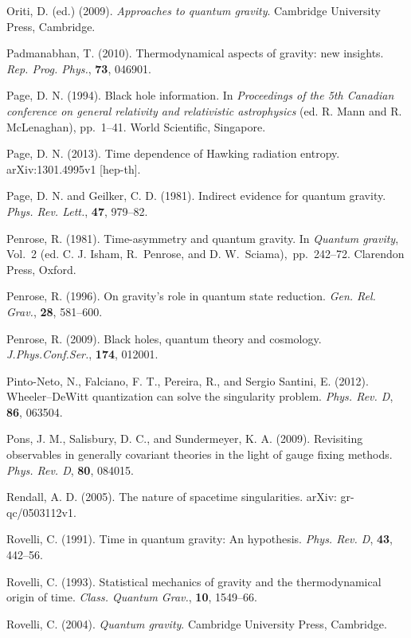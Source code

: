 \documentclass[12pt]{article}
\begin{document}
\bibitem{} Oriti, D. (ed.) (2009). {\em Approaches to quantum
           gravity}. Cambridge University Press, Cambridge. 

\bibitem{} Padmanabhan, T. (2010). Thermodynamical aspects of gravity:
new insights. {\em Rep. Prog. Phys.}, {\bf 73}, 046901.

\bibitem{} Page, D. N. (1994). Black hole information. In {\em
    Proceedings of the 5th Canadian conference on general relativity
    and relativistic astrophysics} (ed. R. Mann and R. McLenaghan),
  pp.~1--41. World Scientific, Singapore. 

\bibitem{} Page, D. N. (2013). Time dependence of Hawking radiation
  entropy. arXiv:1301.4995v1 [hep-th].

\bibitem{} Page, D. N. and Geilker, C. D. (1981). Indirect evidence
           for quantum gravity. {\em Phys. Rev. Lett.}, {\bf 47},
           979--82.

\bibitem{} Penrose, R. (1981). Time-asymmetry and quantum gravity.
           In {\em Quantum gravity}, Vol.~2 (ed. C. J. Isham,
           R.~Penrose, and D. W.~Sciama),~pp.~242--72. Clarendon Press, Oxford.

\bibitem{} Penrose, R. (1996). On gravity's role in quantum state reduction.
           {\em Gen. Rel. Grav.}, {\bf 28}, 581--600.

\bibitem{} Penrose, R. (2009).  	
Black holes, quantum theory and cosmology.
{\em J.Phys.Conf.Ser.}, {\bf 174}, 012001.

\bibitem{} Pinto-Neto, N., Falciano, F. T., Pereira, R., and Sergio
  Santini, E. (2012). Wheeler--DeWitt quantization can solve the
  singularity problem. {\em Phys. Rev. D}, {\bf 86}, 063504.

\bibitem{} Pons, J. M., Salisbury, D. C., and Sundermeyer,
K. A. (2009).
Revisiting observables in generally covariant theories in the light of
gauge fixing methods. {\em Phys. Rev. D}, {\bf 80}, 084015.

\bibitem{} Rendall, A. D. (2005). The nature of spacetime
  singularities. arXiv: gr-qc/0503112v1. 

\bibitem{} Rovelli, C. (1991). Time in quantum gravity: An hypothesis.
 {\em Phys. Rev. D}, {\bf 43}, 442--56.

\bibitem{} Rovelli, C. (1993). Statistical mechanics of gravity and
  the thermodynamical origin of time. {\em Class. Quantum Grav.}, {\bf
    10},  1549--66. 

\bibitem{} Rovelli, C. (2004). {\em Quantum gravity}. Cambridge University
           Press, Cambridge.
\end{document}
